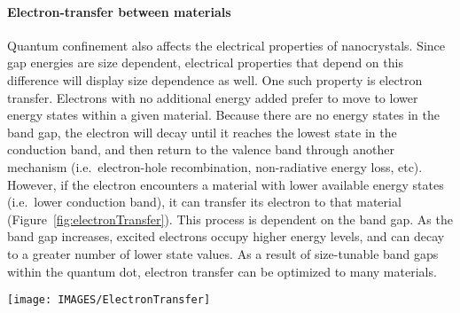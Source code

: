 \paragraph{Electron-transfer between materials}
Quantum confinement also affects the electrical properties of nanocrystals. Since gap energies are size dependent, electrical properties that depend on this difference will display size dependence as well. One such property is electron transfer. Electrons with no additional energy added prefer to move to lower energy states within a given material. Because there are no energy states in the band gap, the electron will decay until it reaches the lowest state in the conduction band, and then return to the valence band through another mechanism (i.e.\ electron-hole recombination, non-radiative energy loss, etc). However, if the electron encounters a material with lower available
energy states (i.e.\ lower conduction band), it can transfer its electron to that material (Figure~\ref{fig:electronTransfer}). This process is dependent on the band gap. As the band gap increases, excited electrons occupy higher energy levels, and can decay to a greater number of
lower state values. As a result of size-tunable band gaps within the quantum dot, electron transfer can be optimized to many materials.
\begin{SCfigure} 
 \centering
 \texttt{[image: IMAGES/ElectronTransfer]}
 \caption[short caption for list]{Electron transfer between materials with different band gaps.\newline If an excited electron in one material (A) encounters a second material (B) with a lower band gap energy, it can transfer its electron to that material. (Image courtesy of J. Winter~\cite{Winter2004})}
 \label{fig:electronTransfer}
\end{SCfigure}

